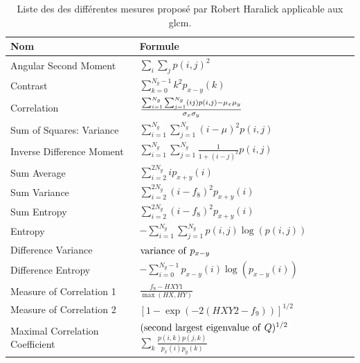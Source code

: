 \begin{table}[H]
    \centering
    \begin{tabular}{ll}
        \toprule
        \textbf{Nom}                & \textbf{Formule}                                                                              \\ \hline
        Angular Second Moment       & $ \sum_i\sum_jp(i,j)^2$                                                                       \\
        Contrast                    & $\sum_{k=0}^{N_g-1} k^2 p_{x-y}(k)$                                                           \\
        Correlation                 & $\frac{\Large{\sum_{i=1}^{N_g}\sum_{j=1}^{N_g}} (ij)p(i,j) - \mu_x\mu_y}{\sigma_x\sigma_y}$   \\
        Sum of Squares: Variance    & $\sum_{i=1}^{N_g}\sum_{j=1}^{N_g} (i - \mu)^2 p(i,j)$                                         \\
        Inverse Difference Moment   & $\sum_{i=1}^{N_g}\sum_{j=1}^{N_g} \frac{1}{1 + (i - j)^2} p(i,j)$                             \\     
        Sum Average                 & $\sum_{i=2}^{2N_g} i p_{x+y}(i)$                                                              \\    
        Sum Variance                & $\sum_{i=2}^{2N_g} (i - f_8)^2 p_{x+y}(i)$                                                    \\    
        Sum Entropy                 & $\sum_{i=2}^{2N_g} (i - f_8)^2 p_{x+y}(i)$                                                    \\    
        Entropy                     & $-\sum_{i=1}^{N_g}\sum_{j=1}^{N_g} p(i,j) \log(p(i,j))$                                       \\    
        Difference Variance         & ${\rm variance \ of ~} p_{x-y}$                                                               \\    
        Difference Entropy          & $-\sum_{i=0}^{N_g-1} p_{x-y}(i) \log(p_{x-y}(i))$                                             \\
        Measure of Correlation 1    & $\frac{f_9 - HXY1}{\max(HX,HY)}$                                                              \\  
        Measure of Correlation 2    & $[1 - \exp(-2(HXY2 - f_9))]^{1/2}$                                                            \\ 
        Maximal Correlation Coefficient    & $({\rm second \ largest \ eigenvalue \ of ~} Q)^{1/2}$ $\sum_k \frac{p(i,k)p(j,k)}{p_x(i)p_y(k)}$ \\ 
        \bottomrule
    \end{tabular}
    \caption{Liste des des différentes mesures proposé par Robert Haralick applicable aux \gls{glcm}.}
    \label{tab:haralick_descriptors}
\end{table}\par
 
